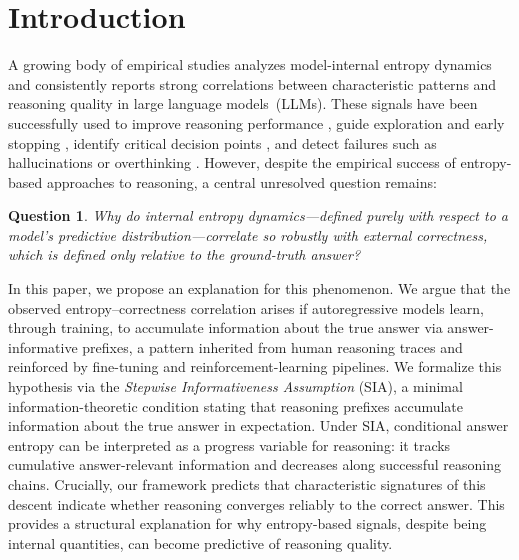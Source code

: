 \documentclass{article}
\newtheorem{question}{Question}
\begin{document}
\vspace{-20pt}
\section{Introduction}

A growing body of empirical studies analyzes model-internal entropy dynamics and consistently reports strong correlations between characteristic patterns and reasoning quality in large language models~(LLMs). These signals have been successfully used to improve reasoning performance \cite{agarwal2025unreasonableeffectivenessentropyminimization, li2025compressingchainofthoughtllmsstep, ton2025understandingchainofthoughtllmsinformation}, guide exploration and early stopping \cite{zhang2025entropybasedexplorationconductionmultistep, sharma2025thinkjustenoughsequencelevel}, identify critical decision points \cite{ali2026entropylensuncoveringdecisionstrategies, wang20258020rulehighentropyminority, qian2025demystifyingreasoningdynamicsmutual}, and detect failures such as hallucinations or overthinking \cite{farquhar_detecting_2024}. However, despite the empirical success of entropy-based approaches to reasoning, a central unresolved question remains:

\begin{question}\label{q:entropy}
Why do internal entropy dynamics—defined purely with respect to a model’s predictive
distribution—correlate so robustly with external correctness, which is defined only
relative to the ground-truth answer?
\end{question}

In this paper, we propose an explanation for this phenomenon. We argue that the observed entropy–correctness correlation arises if autoregressive models learn, through training, to accumulate information about the true answer via answer-informative prefixes, a pattern inherited from human reasoning traces and reinforced by fine-tuning and reinforcement-learning pipelines. We formalize this hypothesis via the \emph{Stepwise Informativeness Assumption} (SIA), a minimal information-theoretic condition stating that reasoning prefixes accumulate information about the true answer in expectation. Under SIA, conditional answer entropy can be interpreted as a progress variable for reasoning: it tracks cumulative answer-relevant information and decreases along successful reasoning chains. Crucially, our framework predicts that characteristic signatures of this descent indicate whether reasoning converges reliably to the correct answer. This provides a structural explanation for why entropy-based signals, despite being internal quantities, can become predictive of reasoning quality.
\end{document}
